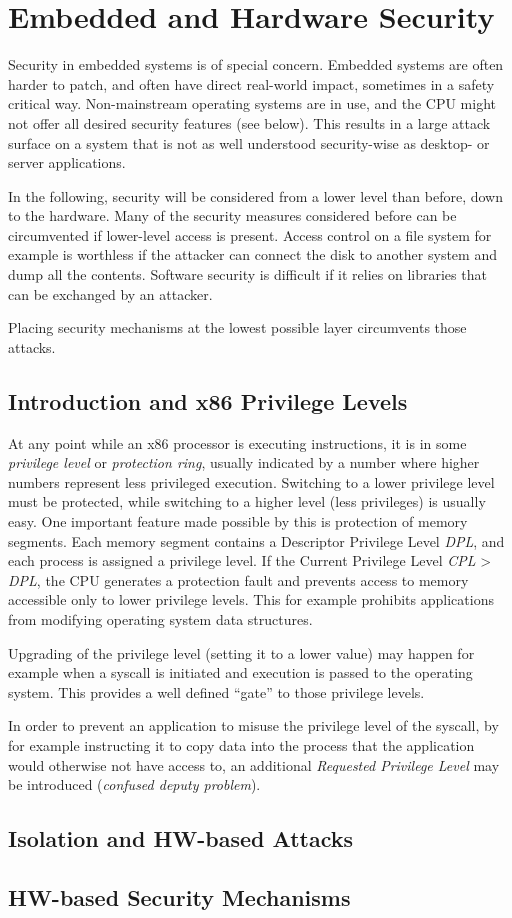 \chapter{Embedded and Hardware Security}

Security in embedded systems is of special concern. Embedded systems are often
harder to patch, and often have direct real-world impact, sometimes in a safety
critical way. Non-mainstream operating systems are in use, and the CPU might not
offer all desired security features (see below). This results in a large attack
surface on a system that is not as well understood security-wise as desktop- or
server applications.

In the following, security will be considered from a lower level than before,
down to the hardware. Many of the security measures considered before can be
circumvented if lower-level access is present. Access control on a file system
for example is worthless if the attacker can connect the disk to another system
and dump all the contents. Software security is difficult if it relies on
libraries that can be exchanged by an attacker.

Placing security mechanisms at the lowest possible layer circumvents those
attacks.

\section{Introduction and x86 Privilege Levels}
At any point while an x86 processor is executing instructions, it is in some
\emph{privilege level} or \emph{protection ring}, usually indicated by a number
where higher numbers represent less privileged execution. Switching to a lower
privilege level must be protected, while switching to a higher level (less
privileges) is usually easy. One important feature made possible by this is
protection of memory segments. Each memory segment contains a Descriptor
Privilege Level \textit{DPL}, and each process is assigned a privilege level. If
the Current Privilege Level \textit{CPL} > \textit{DPL}, the CPU generates a
protection fault and prevents access to memory accessible only to lower
privilege levels. This for example prohibits applications from modifying
operating system data structures.

Upgrading of the privilege level (setting it to a lower value) may happen for
example when a syscall is initiated and execution is passed to the operating
system. This provides a well defined ``gate'' to those privilege levels.

In order to prevent an application to misuse the privilege level of the syscall,
by for example instructing it to copy data into the process that the application
would otherwise not have access to, an additional \textit{Requested Privilege
Level} may be introduced (\emph{confused deputy problem}).


\section{Isolation and HW-based Attacks}
\section{HW-based Security Mechanisms}